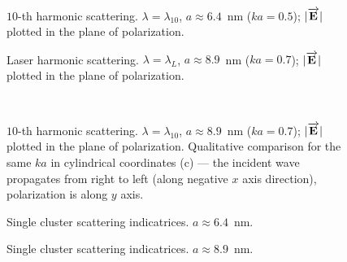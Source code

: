     \begin{figure}[H]
        \hfil
        \caption{$10$-th harmonic scattering. $\lambda = \lambda_{10}$, $a \approx 6.4$~nm ($ka = 0.5$); $|\overrightarrow{\textbf{E}_{}}|$ plotted in the plane of polarization.}
        \label{10h_ka0.5:image}
    \end{figure}

    \begin{figure}[H]
        \hfil
        \caption{Laser harmonic scattering. $\lambda = \lambda_{L}$, $a \approx 8.9$~nm ($ka = 0.7$); $|\overrightarrow{\textbf{E}_{}}|$ plotted in the plane of polarization.}
        \label{1h_ka0.7:image}
    \end{figure}

    \begin{figure}[H]
        \hfil
        \\
        \caption{$10$-th harmonic scattering. $\lambda = \lambda_{10}$, $a \approx 8.9$~nm ($ka = 0.7$); $|\overrightarrow{\textbf{E}_{}}|$ plotted in the plane of polarization. Qualitative comparison for the same $ka$ in cylindrical coordinates (c) --- the incident wave propagates from right to left (along negative $x$ axis direction), polarization is along $y$ axis.}
        \label{10h_ka0.7:image}
    \end{figure}

    \begin{figure}[H]
        \hfil
        \caption{Single cluster scattering indicatrices. $a \approx 6.4$~nm.}
        \label{ka0.5_far_field:image}
    \end{figure}

    \begin{figure}[H]
        \hfil
        \caption{Single cluster scattering indicatrices. $a \approx 8.9$~nm.}
        \label{ka0.7_far_field:image}
    \end{figure}